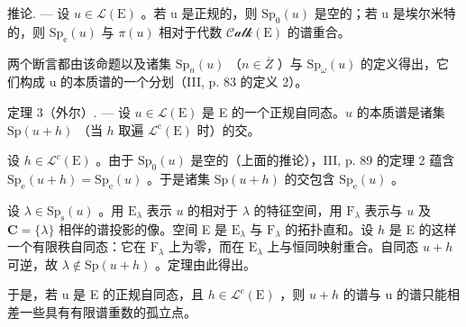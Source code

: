 推论. --- 设 \(u \in \mathcal{L}(\mathrm{E})\) 。若 u 是正规的，则 \(\mathrm{Sp}_{0}(u)\) 是空的；若 u 是埃尔米特的，则 \(\mathrm{Sp}_{\mathrm{e}}(u)\) 与 \(\pi(u)\) 相对于代数 \(\mathcal{Calk}(\mathrm{E})\) 的谱重合。

两个断言都由该命题以及诸集 \(\mathrm{Sp}_{n}(u)\) （\(n \in \overline{Z}\) ）与 \(\mathrm{Sp}_{\omega}(u)\) 的定义得出，它们构成 u 的本质谱的一个分划（III, p. 83 的定义 2）。

定理 3（外尔）. --- 设 \(u \in \mathcal{L}(\mathrm{E})\) 是 E 的一个正规自同态。\(u\) 的本质谱是诸集 \(\mathrm{Sp}(u + h)\) （当 \(h\) 取遍 \(\mathcal{L}^{\mathrm{c}}(\mathrm{E})\) 时）的交。

设 \(h \in \mathcal{L}^c(\mathrm{E})\) 。由于 \(\mathrm{Sp}_0(u)\) 是空的（上面的推论），III, p. 89 的定理 2 蕴含 \(\mathrm{Sp_e}(u + h) = \mathrm{Sp_e}(u)\) 。于是诸集 \(\mathrm{Sp}(u + h)\) 的交包含 \(\mathrm{Sp_e}(u)\) 。

设 \(\lambda \in \mathrm{Sp}_{\mathrm{s}}(u)\) 。用 \(\mathrm{E}_{\lambda}\) 表示 \(u\) 的相对于 \(\lambda\) 的特征空间，用 \(\mathrm{F}_{\lambda}\) 表示与 \(u\) 及 \(\mathbf{C} = \{\lambda\}\) 相伴的谱投影的像。空间 E 是 \(\mathrm{E}_{\lambda}\) 与 \(\mathrm{F}_{\lambda}\) 的拓扑直和。设 \(h\) 是 E 的这样一个有限秩自同态：它在 \(\mathrm{F}_{\lambda}\) 上为零，而在 \(\mathrm{E}_{\lambda}\) 上与恒同映射重合。自同态 \(u + h\) 可逆，故 \(\lambda \notin \mathrm{Sp}(u + h)\) 。定理由此得出。

于是，若 u 是 E 的正规自同态，且 \(h \in \mathcal{L}^{c}(\mathrm{E})\) ，则 \(u + h\) 的谱与 u 的谱只能相差一些具有有限谱重数的孤立点。